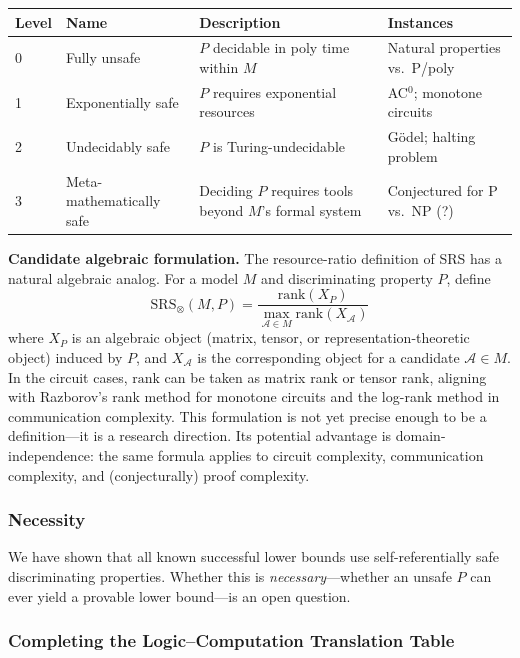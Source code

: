 \documentclass[11pt,a4paper]{article}
\theoremstyle{plain}
\theoremstyle{definition}
\theoremstyle{remark}
\newcommand{\SRS}{\mathrm{SRS}}
\begin{document}
\begin{table}[h]
\centering
\begin{tabular}{@{}llll@{}}
\toprule
Level & Name & Description & Instances \\
\midrule
0 & Fully unsafe & $P$ decidable in poly time within $M$ & Natural properties vs.\ P/poly \\
1 & Exponentially safe & $P$ requires exponential resources & AC$^0$; monotone circuits \\
2 & Undecidably safe & $P$ is Turing-undecidable & G\"{o}del; halting problem \\
3 & Meta-mathematically safe & Deciding $P$ requires tools beyond $M$'s formal system & Conjectured for P vs.\ NP (?) \\
\bottomrule
\end{tabular}
\end{table}

\textbf{Candidate algebraic formulation.} The resource-ratio definition of SRS has a natural algebraic analog. For a model $M$ and discriminating property $P$, define
$$\SRS_{\otimes}(M, P) = \frac{\mathrm{rank}(X_P)}{\max_{\mathcal{A} \in M} \mathrm{rank}(X_{\mathcal{A}})}$$
where $X_P$ is an algebraic object (matrix, tensor, or representation-theoretic object) induced by $P$, and $X_{\mathcal{A}}$ is the corresponding object for a candidate $\mathcal{A} \in M$. In the circuit cases, $\mathrm{rank}$ can be taken as matrix rank or tensor rank, aligning with Razborov's rank method for monotone circuits and the log-rank method in communication complexity. This formulation is not yet precise enough to be a definition---it is a research direction. Its potential advantage is domain-independence: the same formula applies to circuit complexity, communication complexity, and (conjecturally) proof complexity.

\subsubsection{Necessity}

We have shown that all known successful lower bounds use self-referentially safe discriminating properties. Whether this is \emph{necessary}---whether an unsafe $P$ can ever yield a provable lower bound---is an open question.

\subsubsection{Completing the Logic--Computation Translation Table}
\end{document}
